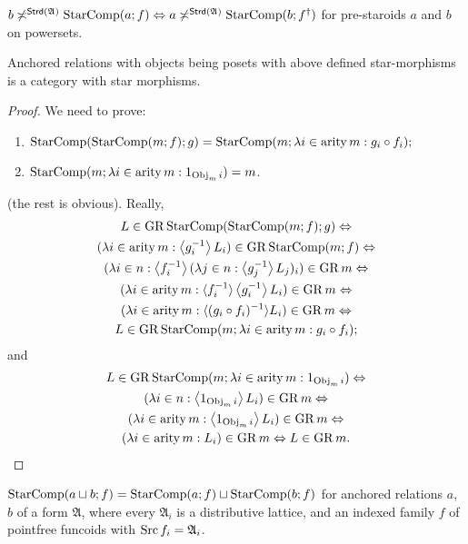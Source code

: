 \begin{conjecture}
$b\not\asymp^{\mathsf{Strd}(\mathfrak{A})}\operatorname{StarComp}(a;f)\Leftrightarrow a\not\asymp^{\mathsf{Strd}(\mathfrak{A})}\operatorname{StarComp}(b;f^{\dagger})$
for pre-staroids $a$ and $b$ on powersets.\end{conjecture}
\begin{prop}
Anchored relations with objects being posets with above defined star-morphisms
is a category with star morphisms.\end{prop}
\begin{proof}
We need to prove:
\begin{enumerate}
\item $\operatorname{StarComp}(\operatorname{StarComp}(m;f);g)=\operatorname{StarComp}(m;\lambda i\in\operatorname{arity} m:g_{i}\circ f_{i});$
\item $\operatorname{StarComp}(m;\lambda i\in\operatorname{arity} m:1_{\operatorname{Obj}_{m}i})=m$.
\end{enumerate}
(the rest is obvious).
Really, 
\begin{multline*}
L\in\operatorname{GR}\operatorname{StarComp}(\operatorname{StarComp}(m;f);g)\Leftrightarrow\\
(\lambda i\in\operatorname{arity} m:\left\langle g_{i}^{-1}\right\rangle L_{i})\in\operatorname{GR}\operatorname{StarComp}(m;f)\Leftrightarrow\\
(\lambda i\in n:\left\langle f_{i}^{-1}\right\rangle(\lambda j\in n:\left\langle g_{j}^{-1}\right\rangle L_{j})_{i})\in\operatorname{GR} m\Leftrightarrow\\
(\lambda i\in\operatorname{arity} m:\langle f_{i}^{-1}\rangle\left\langle g_{i}^{-1}\right\rangle L_{i})\in\operatorname{GR} m\Leftrightarrow\\
(\lambda i\in\operatorname{arity} m:\langle(g_{i}\circ f_{i})^{-1}\rangle L_{i})\in\operatorname{GR} m\Leftrightarrow\\
L\in\operatorname{GR}\operatorname{StarComp}(m;\lambda i\in\operatorname{arity} m:g_{i}\circ f_{i});
\end{multline*}
and
\begin{multline*}
L\in\operatorname{GR}\operatorname{StarComp}(m;\lambda i\in\operatorname{arity} m:1_{\operatorname{Obj}_{m}i})\Leftrightarrow\\
(\lambda i\in n:\left\langle 1_{\operatorname{Obj}_{m}i}\right\rangle L_{i})\in\operatorname{GR} m\Leftrightarrow\\
(\lambda i\in\operatorname{arity} m:\left\langle 1_{\operatorname{Obj}_{m}i}\right\rangle L_{i})\in\operatorname{GR} m\Leftrightarrow\\
(\lambda i\in\operatorname{arity} m:L_{i})\in\operatorname{GR} m\Leftrightarrow L\in\operatorname{GR} m.
\end{multline*}
\end{proof}

\begin{conjecture}
$\operatorname{StarComp}(a\sqcup b;f)=\operatorname{StarComp}(a;f)\sqcup\operatorname{StarComp}(b;f)$ for anchored
relations $a$, $b$ of a form $\mathfrak{A}$, where every $\mathfrak{A}_{i}$
is a distributive lattice, and an indexed family $f$ of pointfree
funcoids with $\operatorname{Src} f_{i}=\mathfrak{A}_{i}$.
\end{conjecture}


